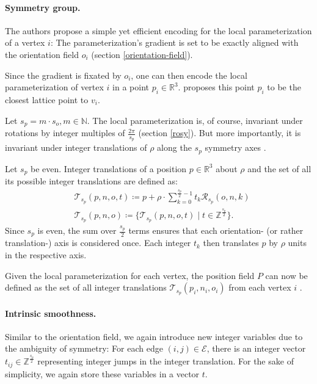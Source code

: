\documentclass{ACGSeminar}
\begin{document}
\paragraph{Symmetry group.}
The authors propose a simple yet efficient encoding for the local parameterization of a vertex $i$: The parameterization's gradient is set to be exactly aligned with the orientation field $o_i$ (section \ref{orientation-field}).

Since the gradient is fixated by $o_i$, one can then encode the local parameterization of vertex $i$ in a point $p_i \in \mathbb{R}^3$. \cite{jakob2015instant} proposes this point $p_i$ to be the closest lattice point to $v_i$.

Let $s_p = m \cdot s_o, m \in \mathbb{N}$. The local parameterization is, of course, invariant under rotations by integer multiples of $\frac{2\pi}{s_p}$ (section \ref{rosy}). But more importantly, it is invariant under integer translations of $\rho$ along the $s_p$ symmetry axes \cite{jakob2015instant}.\bigskip

Let $s_p$ be even. Integer translations of a position $p \in \mathbb{R}^3$ about $\rho$ and the set of all its possible integer translations are defined as:
\begin{equation*}
\begin{split}
	& \mathcal{T}_{s_p}(p,n,o,t) \coloneqq p + \rho \cdot \sum_{k=0}^{\frac{s_p}{2}-1} t_k \mathcal{R}_{s_p}(o,n,k)\\
	& \mathcal{T}_{s_p}(p,n,o) \coloneqq \{\mathcal{T}_{s_p}(p,n,o,t) \mid t \in \mathbb{Z}^{\frac{s_p}{2}}\}.
\end{split}
\end{equation*}
Since $s_p$ is even, the sum over $\frac{s_p}{2}$ terms ensures that each orientation- (or rather translation-) axis is considered once. Each integer $t_k$ then translates $p$ by $\rho$ units in the respective axis.

Given the local parameterization for each vertex, the position field $P$ can now be defined as the set of all integer translations $\mathcal{T}_{s_p}(p_i, n_i, o_i)$ from each vertex $i$ \cite{jakob2015instant}.

\paragraph{Intrinsic smoothness.}
Similar to the orientation field, we again introduce new integer variables due to the ambiguity of symmetry: For each edge $(i,j) \in \mathcal{E}$, there is an integer vector $t_{ij} \in \mathbb{Z}^{\frac{s_p}{2}}$ representing integer jumps in the integer translation. For the sake of simplicity, we again store these variables in a vector $t$.\bigskip
\end{document}
